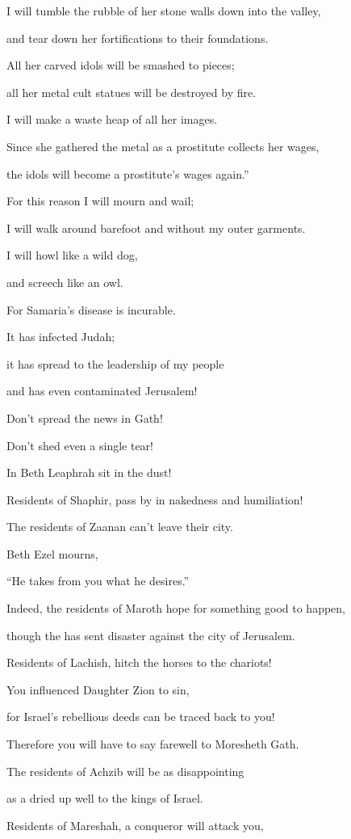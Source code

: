 {\par }{\Q I will tumble
the rubble of her stone
walls down into the valley,
\par }{\Q and tear down
her fortifications to their foundations.
\par }{\Q {}All
her carved idols
will be smashed
to pieces;
\par }{\Q all
her metal cult statues
will be destroyed
by fire.
\par }{\Q I will make
a waste heap
of all
her images.
\par }{\Q Since
she gathered
the metal as a prostitute
collects her wages,
\par }{\Q the idols will become a prostitute’s
wages
again.”
\par }{\Q {}For
this
reason I will mourn
and wail;
\par }{\Q I will walk
around barefoot
and without my outer garments.
\par }{\Q I will howl
like a wild dog,
\par }{\Q and screech
like an owl.
\par }{\Q {}For
Samaria’s disease
is incurable.
\par }{\Q It has infected
Judah;
\par }{\Q it has spread
to
the leadership
of my people
\par }{\Q and has even
contaminated Jerusalem!
\par }{\Q {}Don’t
spread
the news
in Gath!

\par }{\Q Don’t
shed even a single tear!

\par }{\Q In Beth Leaphrah
sit
in the dust!
\par }{\Q {}Residents
of Shaphir,
pass
by in nakedness
and humiliation!

\par }{\Q The residents
of Zaanan
can’t
leave
their city.

\par }{\Q Beth Ezel
mourns,
\par }{\Q “He takes
from
you what he desires.”
\par }{\Q {}Indeed,
the residents
of Maroth
hope for something good
to happen,

\par }{\Q though
the
{}
has sent disaster
against the city
of Jerusalem.
\par }{\Q {}Residents
of Lachish,
hitch
the horses
to the chariots!
\par }{\Q You influenced
Daughter
Zion
to sin,
\par }{\Q for
Israel’s
rebellious
deeds can be traced back to you!
\par }{\Q {}Therefore
you will have to say
farewell
to Moresheth Gath.
\par }{\Q The residents
of Achzib
will be as disappointing
\par }{\Q as a dried up well to the kings
of Israel.
\par }{\Q {}Residents
of Mareshah,
a conqueror
will attack
you,

}
